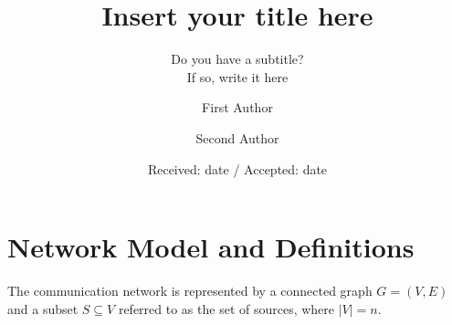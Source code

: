 \title{Insert your title here%
}
\subtitle{Do you have a subtitle?\\ If so, write it here}


\author{First Author         \and
        Second Author %
}



\date{Received: date / Accepted: date}


\maketitle

\begin{abstract}
\keywords{}
\end{abstract}

\section{Network Model and Definitions} \label{sec:def}

The communication network is represented by a connected graph $G=(V,E)$ and a subset $S\subseteq V$ referred to as the set of sources, where $|V|=n$. 

